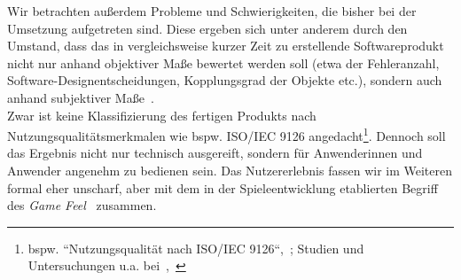 Wir betrachten außerdem Probleme und Schwierigkeiten, die bisher bei der Umsetzung aufgetreten sind.
Diese ergeben sich unter anderem durch den Umstand, dass das in vergleichsweise kurzer Zeit zu erstellende Softwareprodukt nicht nur anhand objektiver Maße bewertet werden soll (etwa der Fehleranzahl, Software-Designentscheidungen, Kopplungsgrad der Objekte etc.), sondern auch anhand subjektiver Maße~\cite[385]{Bal08}.\\
Zwar ist keine Klassifizierung des fertigen Produkts nach Nutzungsqualitätsmerkmalen wie bspw. ISO/IEC 9126 angedacht\footnote{bspw. ``Nutzungsqualität nach ISO/IEC 9126``,~\cite[466]{Bal08}; Studien und Untersuchungen u.a. bei~\cite[]{AZMK17},~\cite[]{Ber10}}.
Dennoch soll das Ergebnis nicht nur technisch ausgereift, sondern für Anwenderinnen und Anwender angenehm zu bedienen sein.
Das Nutzererlebnis fassen wir im Weiteren formal eher unscharf, aber mit dem in der Spieleentwicklung etablierten Begriff des \textit{Game Feel}~\cite[]{Swi08} zusammen.

